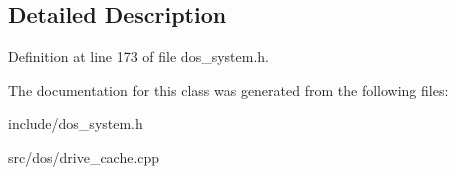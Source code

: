 \subsection{Detailed Description}


Definition at line 173 of file dos\-\_\-system.\-h.



The documentation for this class was generated from the following files\-:\begin{DoxyCompactItemize}
\item 
include/dos\-\_\-system.\-h\item 
src/dos/drive\-\_\-cache.\-cpp\end{DoxyCompactItemize}
